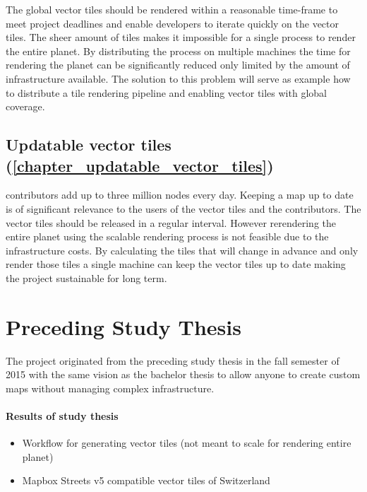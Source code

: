 The global vector tiles should be rendered within a reasonable time-frame
to meet project deadlines and enable developers to iterate quickly on the vector tiles.
The sheer amount of tiles makes it impossible for a single process to render the entire planet.
By distributing the process on multiple machines the time for rendering the planet can be significantly reduced only limited
by the amount of infrastructure available. The solution to this problem will serve as example how to distribute a tile rendering pipeline and enabling
vector tiles with global coverage.

\subsection*{Updatable vector tiles (\autoref{chapter_updatable_vector_tiles})}\label{intro_scalable_rendering_process}

\osm{} contributors add up to three million nodes every day\cite{osm_wiki_2016}. Keeping a map up to date is of significant relevance to the users of the vector tiles and the contributors. The vector tiles should be released in a regular interval.
However rerendering the entire planet using the scalable rendering process is not feasible due to the infrastructure costs. By calculating the tiles that will change in advance and only render those tiles a single machine can keep the vector tiles up to date making the project sustainable for long term.

\section{Preceding Study Thesis}\label{part1_scope_of_study_thesis}

The \osmvt{} project originated from the preceding study thesis in the fall semester of 2015 with the same vision as the bachelor thesis to allow anyone to create custom \osm{} maps without managing complex infrastructure. 

\paragraph{Results of study thesis}
\begin{itemize}
    \item Workflow for generating vector tiles (not meant to scale for rendering entire planet)
    \item Mapbox Streets v5 compatible vector tiles of Switzerland
\end{itemize}

